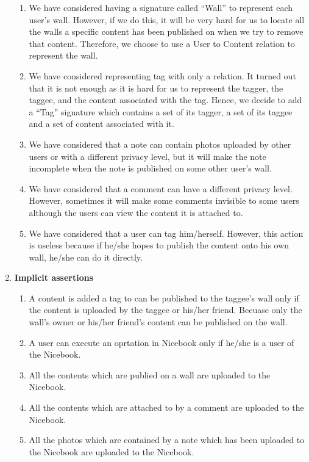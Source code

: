 \documentclass[titlepage]{article}
\begin{document}
\begin{enumerate}[\bf\large 1.]
\begin{enumerate}[1)]
        \item We have considered having a signature called “Wall” to represent each user’s wall. However, if we do this, it will be very hard for us to locate all the walls a specific content has been published on when we try to remove that content. Therefore, we choose to use a User to Content relation to represent the wall.
        \item We have considered representing tag with only a relation. It turned out that it is not enough as it is hard for us to represent the tagger, the taggee, and the content associated with the tag. Hence, we decide to add a “Tag” signature which contains a set of its tagger, a set of its taggee and a set of content associated with it. 
        \item We have considered that a note can contain photos uploaded by other users or with a different privacy level, but it will make the note incomplete when the note is published on some other user's wall.
        \item We have considered that a comment can have a different privacy level. However, sometimes it will make some comments invisible to some users although the users can view the content it is attached to.
        \item We have considered that a user can tag him/herself. However, this action is useless because if he/she hopes to publish the content onto his own wall, he/she can do it directly.
    \end{enumerate}
    \item {\bf\large Implicit assertions}
    \begin{enumerate}[1)]
        \item A content is added a tag to can be published to the taggee's wall only if the content is uploaded by the taggee or his/her friend. Becuase only the wall's owner or his/her friend's content can be published on the wall.
        \item A user can execute an oprtation in Nicebook only if he/she is a user of the Nicebook.
        \item All the contents which are publied on a wall are uploaded to the Nicebook.
        \item All the contents which are attached to by a comment are uploaded to the Nicebook.
        \item All the photos which are contained by a note which has been uploaded to the Nicebook are uploaded to the Nicebook.
    \end{enumerate}

\end{enumerate}
\end{document}
